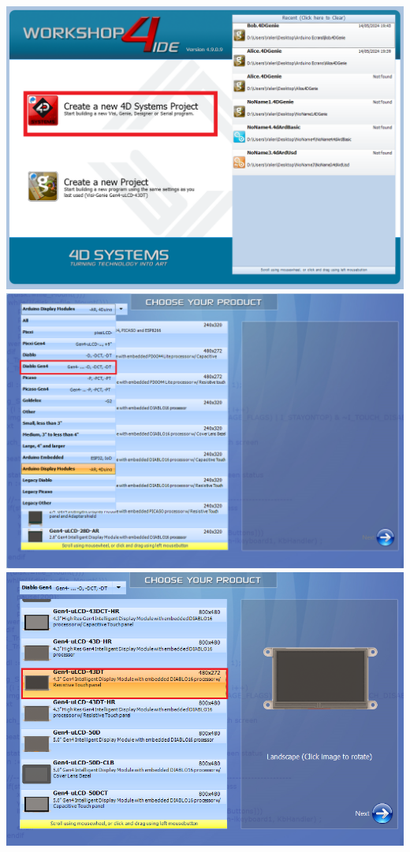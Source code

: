 \documentclass[11pt]{article}
\begin{document}
\includegraphics[width=\textwidth]{Format1.png}
\includegraphics[width=\textwidth]{Format2.png}
\includegraphics[width=\textwidth]{Format3.png}
\end{document}
